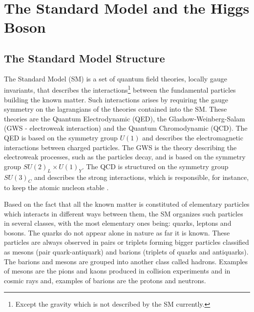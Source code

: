 \chapter{The Standard Model and the Higgs Boson}

\section{The Standard Model Structure}
The Standard Model (SM) is a set of quantum field theories, locally gauge invariants, that describes the interactions\footnote{Except the gravity which is not described by the SM currently.} between the fundamental particles building the known matter. Such interactions arises by requiring the gauge symmetry on the lagrangians of the theories contained into the SM. These theories are the Quantum Electrodynamic (QED), the Glashow-Weinberg-Salam (GWS - electroweak interaction) and the Quantum Chromodynamic (QCD). The QED is based on the symmetry group $U(1)$ and describes the electromagnetic interactions between charged particles. The GWS is the theory describing the electroweak processes, such as the particles decay, and is based on the symmetry group $SU(2)_L \times U(1)_Y$. The QCD is structured on the symmetry group $SU(3)_C$ and describes the strong interactions, which is responsible, for instance, to keep the atomic nucleon stable \cite{bib:whitbeck-2013, bib:brachem-2012}.

Based on the fact that all the known matter is constituted of elementary particles which interacts in different ways between them, the SM organizes such particles in several classes, with the most elementary ones being: quarks, leptons and bosons. The quarks do not appear alone in nature as far it is known. These particles are always observed in pairs or triplets forming bigger particles classified as mesons (pair quark-antiquark) and barions (triplets of quarks and antiquarks). The barions and mesons are grouped into another class called hadrons. Examples of mesons are the pions and kaons produced in collision experiments and in cosmic rays and, examples of barions are the protons and neutrons.

